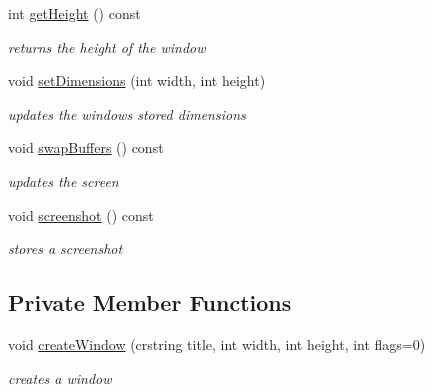 \begin{DoxyCompactItemize}
\mbox{\label{classnta_1_1Window_a0daae9b6ad0a0ea834f90e86a9416f88}} 
int \hyperlink{classnta_1_1Window_a0daae9b6ad0a0ea834f90e86a9416f88}{get\+Height} () const
\begin{DoxyCompactList}\small\item\em returns the height of the window \end{DoxyCompactList}\item 
\mbox{\label{classnta_1_1Window_a3dd8aab88817189b409643d75e476597}} 
void \hyperlink{classnta_1_1Window_a3dd8aab88817189b409643d75e476597}{set\+Dimensions} (int width, int height)
\begin{DoxyCompactList}\small\item\em updates the window\textquotesingle{}s stored dimensions \end{DoxyCompactList}\item 
\mbox{\label{classnta_1_1Window_a5fdc643079410c14855a260ace84478e}} 
void \hyperlink{classnta_1_1Window_a5fdc643079410c14855a260ace84478e}{swap\+Buffers} () const
\begin{DoxyCompactList}\small\item\em updates the screen \end{DoxyCompactList}\item 
\mbox{\label{classnta_1_1Window_aa144f6bb014aaad3c91c3f3e6ad56f9c}} 
void \hyperlink{classnta_1_1Window_aa144f6bb014aaad3c91c3f3e6ad56f9c}{screenshot} () const
\begin{DoxyCompactList}\small\item\em stores a screenshot \end{DoxyCompactList}\end{DoxyCompactItemize}
\subsection*{Private Member Functions}
\begin{DoxyCompactItemize}
\item 
\mbox{\label{classnta_1_1Window_a564ca2324e54c94f9e0f19d66017c07a}} 
void \hyperlink{classnta_1_1Window_a564ca2324e54c94f9e0f19d66017c07a}{create\+Window} (crstring title, int width, int height, int flags=0)
\begin{DoxyCompactList}\small\item\em creates a window \end{DoxyCompactList}\end{DoxyCompactItemize}
